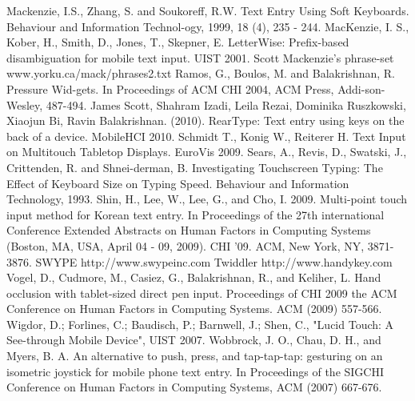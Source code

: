 \documentclass{chi2011}
\begin{document}
\begin{thebibliography}{9}
 Mackenzie, I.S., Zhang, S. and Soukoreff, R.W. Text Entry Using Soft Keyboards. Behaviour and Information Technol-ogy, 1999, 18 (4), 235 - 244.
 MacKenzie, I. S., Kober, H., Smith, D., Jones, T., Skepner, E. LetterWise: Prefix-based disambiguation for mobile text input. UIST 2001.
 Scott Mackenzie's phrase-set www.yorku.ca/mack/phrases2.txt
 Ramos, G., Boulos, M. and Balakrishnan, R. Pressure Wid-gets. In Proceedings of ACM CHI 2004, ACM Press, Addi-son-Wesley, 487-494.
 James Scott, Shahram Izadi, Leila Rezai, Dominika Ruszkowski, Xiaojun Bi, Ravin Balakrishnan. (2010). RearType: Text entry using keys on the back of a device. MobileHCI 2010. 
 Schmidt T., Konig W., Reiterer H. Text Input on Multitouch Tabletop Displays. EuroVis 2009.
 Sears, A., Revis, D., Swatski, J., Crittenden, R. and Shnei-derman, B. Investigating Touchscreen Typing: The Effect of Keyboard Size on Typing Speed. Behaviour and Information Technology, 1993.
 Shin, H., Lee, W., Lee, G., and Cho, I. 2009. Multi-point touch input method for Korean text entry. In Proceedings of the 27th international Conference Extended Abstracts on Human Factors in Computing Systems (Boston, MA, USA, April 04 - 09, 2009). CHI '09. ACM, New York, NY, 3871-3876.
 SWYPE http://www.swypeinc.com
 Twiddler http://www.handykey.com
 Vogel, D., Cudmore, M., Casiez, G., Balakrishnan, R., and Keliher, L. Hand occlusion with tablet-sized direct pen input. Proceedings of CHI 2009  the ACM Conference on Human Factors in Computing Systems. ACM (2009) 557-566. 
 Wigdor, D.; Forlines, C.; Baudisch, P.; Barnwell, J.; Shen, C., "Lucid Touch: A See-through Mobile Device", UIST 2007.
 Wobbrock, J. O., Chau, D. H., and Myers, B. A. An alternative to push, press, and tap-tap-tap: gesturing on an isometric joystick for mobile phone text entry. In Proceedings of the SIGCHI Conference on Human Factors in Computing Systems, ACM (2007) 667-676.


\end{thebibliography}
\end{document}
